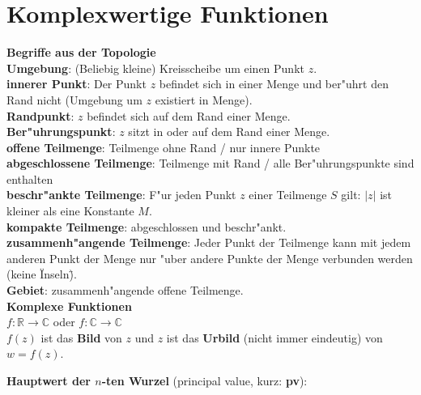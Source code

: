 \section{Komplexwertige Funktionen}
\textbf{Begriffe aus der Topologie}\\
\textbf{Umgebung}: (Beliebig kleine) Kreisscheibe um einen Punkt $z$.\\
\textbf{innerer Punkt}: Der Punkt $z$ befindet sich in einer Menge und ber"uhrt den Rand nicht (Umgebung um $z$ existiert in Menge).\\
\textbf{Randpunkt}: $z$ befindet sich auf dem Rand einer Menge.\\
\textbf{Ber"uhrungspunkt}: $z$ sitzt in oder auf dem Rand einer Menge.\\
\textbf{offene Teilmenge}: Teilmenge ohne Rand / nur innere Punkte\\
\textbf{abgeschlossene Teilmenge}: Teilmenge mit Rand / alle Ber"uhrungspunkte sind enthalten\\
\textbf{beschr"ankte Teilmenge}: F"ur jeden Punkt $z$ einer Teilmenge $S$ gilt: $\vert z \vert$ ist kleiner
als eine Konstante $M$.\\
\textbf{kompakte Teilmenge}: abgeschlossen und beschr"ankt.\\
\textbf{zusammenh"angende Teilmenge}: Jeder Punkt der Teilmenge kann mit jedem anderen Punkt der Menge nur "uber
andere Punkte der Menge verbunden werden (keine \"Inseln\").\\
\textbf{Gebiet}: zusammenh"angende offene Teilmenge.\\

\textbf{Komplexe Funktionen}\\
$f: \mathbb{R} \to \mathbb{C} $ oder $f: \mathbb{C} \to \mathbb{C} $\\
$f(z)$ ist das \textbf{Bild} von $z$ und $z$ ist das \textbf{Urbild} (nicht immer eindeutig) von $w = f(z)$.

\textbf{Hauptwert der $n$-ten Wurzel} (principal value, kurz: \textbf{pv}):\\

